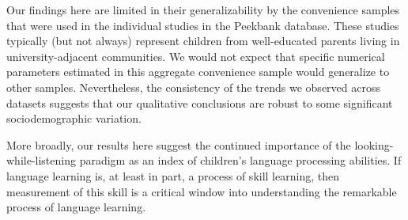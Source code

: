 \documentclass[9pt,twocolumn,twoside,]{pnas-new}
\begin{document}
Our findings here are limited in their generalizability by the
convenience samples that were used in the individual studies in the
Peekbank database. These studies typically (but not always) represent
children from well-educated parents living in university-adjacent
communities. We would not expect that specific numerical parameters
estimated in this aggregate convenience sample would generalize to other
samples. Nevertheless, the consistency of the trends we observed across
datasets suggests that our qualitative conclusions are robust to some
significant sociodemographic variation.

More broadly, our results here suggest the continued importance of the
looking-while-listening paradigm as an index of children's language
processing abilities. If language learning is, at least in part, a
process of skill learning, then measurement of this skill is a critical
window into understanding the remarkable process of language learning.

\showmatmethods
\showacknow
\pnasbreak

\newpage
\end{document}
